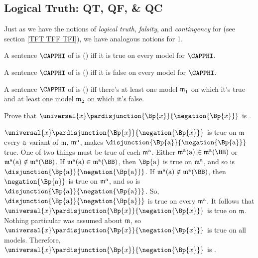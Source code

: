 \subsection{Logical Truth: QT, QF, \& QC}\label{QT QT QI}
Just as we have the notions of \emph{logical truth}, \emph{falsity}, and \emph{contingency} for \GSL{} (see section \ref{TFT TFF TFI}), we have analogous notions for \GQL{}1.
\begin{majorILnc}{}
A sentence $\CAPPHI$ of \GQL{} is  () iff it is true on every model for $\CAPPHI$.
\end{majorILnc} 
\begin{majorILnc}{}
A sentence $\CAPPHI$ of \GQL{} is  () iff it is false on every model for $\CAPPHI$.
\end{majorILnc} 
\begin{majorILnc}{}
A sentence $\CAPPHI$ of \GQL{} is  () iff there's at least one model $\mathfrak{m^{\mathrm{}}_{\mathrm{1}}}$ on which it's true and at least one model $\mathfrak{m^{\mathrm{}}_{\mathrm{2}}}$ on which it's false.
\end{majorILnc} 
\begin{majorILnc}{}
	Prove that $\universal{\variable{x}}\pardisjunction{\Bp{\variable{x}}}{\negation{\Bp{\variable{x}}}}$ is .
\end{majorILnc}
\begin{PROOF}
	$\universal{\variable{x}}\pardisjunction{\Bp{\variable{x}}}{\negation{\Bp{\variable{x}}}}$ is true on $\mathfrak{m}$ \Iff every $\mathrm{a}$-variant of $\mathfrak{m}$, $\mathfrak{m^{\mathrm{\mathrm{a}}}_{\mathrm{}}}$, makes $\disjunction{\Bp{\constant{a}}}{\negation{\Bp{\constant{a}}}}$ true.
	One of two things must be true of each $\mathfrak{m^{\mathrm{\mathrm{a}}}_{\mathrm{}}}$.
	Either $\As{\constant{a}}{}(\constant{a})\in\As{\constant{a}}{}(\BB)$ or $\As{\constant{a}}{}(\constant{a})\notin\As{\constant{a}}{}(\BB)$.
	If $\As{\constant{a}}{}(\constant{a})\in\As{\constant{a}}{}(\BB)$, then $\Bp{\constant{a}}$ is true on $\mathfrak{m^{\mathrm{\mathrm{a}}}_{\mathrm{}}}$, and so is $\disjunction{\Bp{\constant{a}}}{\negation{\Bp{\constant{a}}}}$.
	If $\As{\constant{a}}{}(\constant{a})\notin\As{\constant{a}}{}(\BB)$, then $\negation{\Bp{\constant{a}}}$ is true on $\mathfrak{m^{\mathrm{\mathrm{a}}}_{\mathrm{}}}$, and so is $\disjunction{\Bp{\constant{a}}}{\negation{\Bp{\constant{a}}}}$.
	So, $\disjunction{\Bp{\constant{a}}}{\negation{\Bp{\constant{a}}}}$ is true on every $\mathfrak{m^{\mathrm{\mathrm{a}}}_{\mathrm{}}}$.
	It follows that $\universal{\variable{x}}\pardisjunction{\Bp{\variable{x}}}{\negation{\Bp{\variable{x}}}}$ is true on $\mathfrak{m}$.
	Nothing particular was assumed about $\mathfrak{m}$, so $\universal{\variable{x}}\pardisjunction{\Bp{\variable{x}}}{\negation{\Bp{\variable{x}}}}$ is true on all models.
	Therefore, $\universal{\variable{x}}\pardisjunction{\Bp{\variable{x}}}{\negation{\Bp{\variable{x}}}}$ is .
\end{PROOF}

